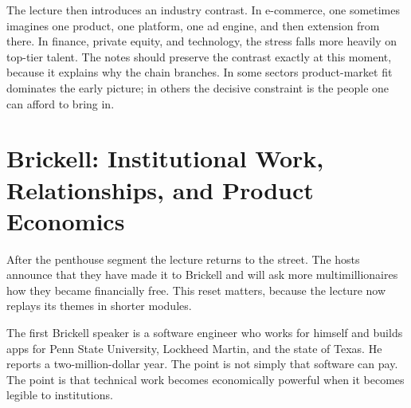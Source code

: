 \begin{figure}
\centering
{}
\end{figure}

The lecture then introduces an industry contrast. In e-commerce, one sometimes imagines one product, one platform, one ad engine, and then extension from there. In finance, private equity, and technology, the stress falls more heavily on top-tier talent. The notes should preserve the contrast exactly at this moment, because it explains why the chain branches. In some sectors product-market fit dominates the early picture; in others the decisive constraint is the people one can afford to bring in.

\section{Brickell: Institutional Work, Relationships, and Product Economics}

After the penthouse segment the lecture returns to the street. The hosts announce that they have made it to Brickell and will ask more multimillionaires how they became financially free. This reset matters, because the lecture now replays its themes in shorter modules.

The first Brickell speaker is a software engineer who works for himself and builds apps for Penn State University, Lockheed Martin, and the state of Texas. He reports a two-million-dollar year. The point is not simply that software can pay. The point is that technical work becomes economically powerful when it becomes legible to institutions.

